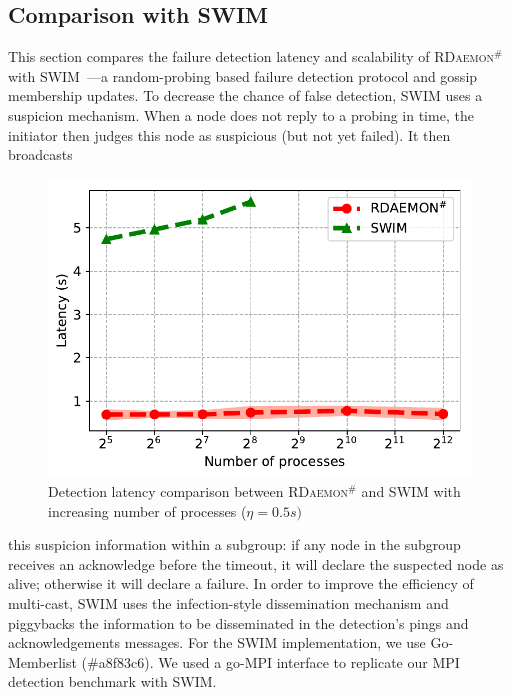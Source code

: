 \documentclass[sigconf]{acmart}
\newcommand{\mpi}[0]{\textsc{MPI}\xspace}
\newcommand{\ourwork}[0]{\textsc{RDaemon}\ensuremath{^\#}\xspace}
\begin{document}
\subsection{Comparison with SWIM}
This section compares the failure detection latency and scalability of \ourwork with SWIM~\cite{Abhinandan02}---a random-probing based failure detection protocol and gossip membership updates. To decrease
the chance of false detection, SWIM uses a suspicion mechanism. When a node does not reply to a probing in time, the initiator then judges this node as suspicious (but not yet failed). It then broadcasts
\begin{figure}[h]
  \centering
  \includegraphics[width=\linewidth]{Scale_prrte_swim.pdf}
  \caption{Detection latency comparison between \ourwork and SWIM with increasing number of processes ($\eta=0.5s)$}
  \label{fig:scale_swim}
\end{figure}
this suspicion information within a subgroup: if any node in the subgroup receives an acknowledge before the timeout, it will declare the suspected node as alive; otherwise it will declare a failure. In order to improve the efficiency of multi-cast, SWIM uses the infection-style dissemination mechanism and piggybacks the information to be disseminated in the detection's pings and acknowledgements messages.
For the SWIM implementation, we use Go-Memberlist (\#a8f83c6). We used a go-\mpi interface
to replicate our \mpi detection benchmark with SWIM.
\end{document}
